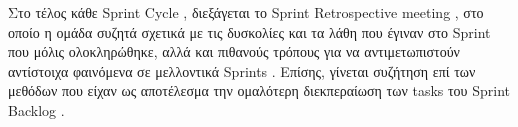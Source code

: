 \documentclass{../ol-softwaremanual}
\begin{document}
	\vspace{5pt}
	
	Στο τέλος κάθε \en Sprint Cycle \gr , διεξάγεται το \en Sprint Retrospective meeting \gr , στο οποίο η ομάδα συζητά σχετικά με τις δυσκολίες και τα λάθη που έγιναν στο \en Sprint \gr που μόλις ολοκληρώθηκε, αλλά και πιθανούς τρόπους για να αντιμετωπιστούν αντίστοιχα φαινόμενα σε μελλοντικά \en Sprints \gr . Επίσης, γίνεται συζήτηση επί των μεθόδων που είχαν ως αποτέλεσμα την ομαλότερη διεκπεραίωση των \en tasks \gr του \en Sprint Backlog \gr .
	
	
	
	
\end{document}
